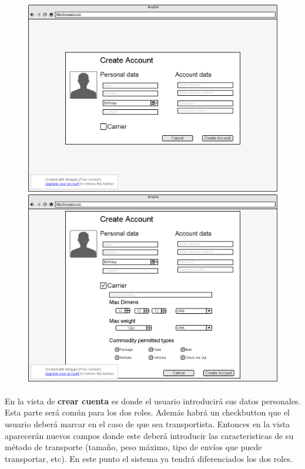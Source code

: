 \documentclass[10pt, a4paper,spanish]{article}
\begin{document}
			\begin{figure}[H]
				\centering
				\begin{minipage}[b]{0.49\textwidth}
					\includegraphics[width=\textwidth]{res/CrearCuenta.png}
				\end{minipage}
				\begin{minipage}[b]{0.49\textwidth}
					\includegraphics[width=\textwidth]{res/CrearCuentaTransportista.png}
				\end{minipage}
			\end{figure}

			\paragraph{}
			En la vista de \textbf{crear cuenta} es donde el usuario introducirá sus datos personales. Esta parte será común para los dos roles. Además habrá un checkbutton que el usuario deberá marcar en el caso de que sea transportista. Entonces en la vista aparecerán nuevos campos donde este deberá introducir las caracteristicas de su método de transporte (tamaño, peso máximo, tipo de envíos que puede transportar, etc). En este punto el sistema ya tendrá diferenciados los dos roles.
\end{document}
